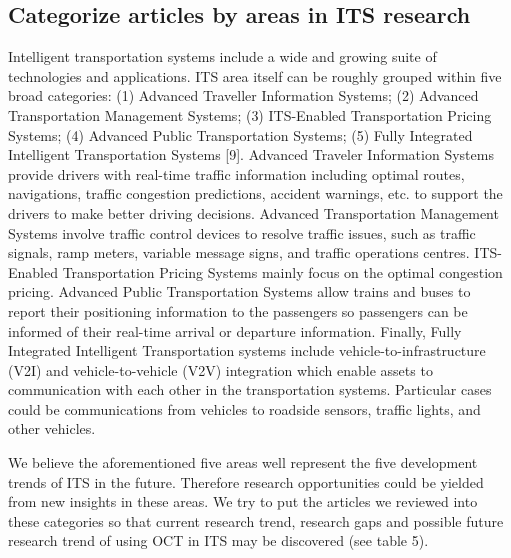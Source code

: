 \documentclass[12pt,onecolumn,twoside]{JCTA}
\theoremstyle{mystyle}
\begin{document}
\subsection{Categorize articles by areas in ITS research}
Intelligent transportation systems include a wide and growing suite of technologies and applications. ITS area itself can be roughly grouped within five broad categories: (1) Advanced Traveller Information Systems; (2) Advanced Transportation Management Systems; (3) ITS-Enabled Transportation Pricing Systems; (4) Advanced Public Transportation Systems; (5) Fully Integrated Intelligent Transportation Systems [9]. Advanced Traveler Information Systems provide drivers with real-time traffic information including optimal routes, navigations, traffic congestion predictions, accident warnings, etc. to support the drivers to make better driving decisions. Advanced Transportation Management Systems involve traffic control devices to resolve traffic issues, such as traffic signals, ramp meters, variable message signs, and traffic operations centres. ITS-Enabled Transportation Pricing Systems mainly focus on the optimal congestion pricing. Advanced Public Transportation Systems allow trains and buses to report their positioning information to the passengers so passengers can be informed of their real-time arrival or departure information. Finally, Fully Integrated Intelligent Transportation systems include vehicle-to-infrastructure (V2I) and vehicle-to-vehicle (V2V) integration which enable assets to communication with each other in the transportation systems. Particular cases could be communications from vehicles to roadside sensors, traffic lights, and other vehicles.

We believe the aforementioned five areas well represent the five development trends of ITS in the future. Therefore research opportunities could be yielded from new insights in these areas. We try to put the articles we reviewed into these categories so that current research trend, research gaps and possible future research trend of using OCT in ITS may be discovered (see table 5).
\end{document}
